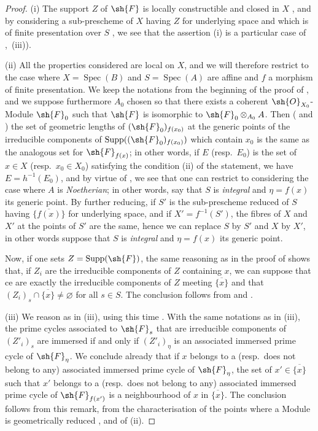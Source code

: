 \begin{proof}
\label{IV.9.9.2-proof}
(i) The support $Z$ of $\sh{F}$ is locally constructible and closed in $X$ , and by considering a sub-prescheme of $X$ having $Z$ for underlying space and which is of finite presentation over $S$ , we see that the assertion (i) is a particular case of ,~(iii)).

(ii) All the properties considered are local on $X$, and we will therefore restrict to the case where $X=\operatorname{Spec}(B)$ and $S=\operatorname{Spec}(A)$ are affine and $f$ a morphism of finite presentation.
We keep the notations from the beginning of the proof of , and we suppose furthermore $A_0$ chosen so that there exists a coherent $\sh{O}_{X_0}$-Module $\sh{F}_0$ such that $\sh{F}$ is isomorphic to $\sh{F}_0\otimes_{A_0}A$.
Then ( and ) the set of geometric lengths of $(\sh{F}_0)_{f(x_0)}$ at the generic points of the irreducible components of $\operatorname{Supp}((\sh{F}_0)_{f(x_0)})$ which contain $x_0$ is the same as the analogous set for $\sh{F}_{f(x)}$; in other words, if $E$ (resp.~$E_0$) is the set of $x\in X$ (resp.~$x_0\in X_0$) satisfying the condition (ii) of the statement, we have $E=h^{-1}(E_0)$, and by virtue of , we see that one can restrict to considering the case where $A$ is \emph{Noetherian}; in other words, say that $S$ is \emph{integral} and $\eta=f(x)$ its generic point.
By further reducing, if $S'$ is the sub-prescheme reduced of $S$ having $\{\overline{f(x)}\}$ for underlying space, and if $X'=f^{-1}(S')$, the fibres of $X$ and $X'$ at the points of $S'$ are the same, hence we can replace $S$ by $S'$ and $X$ by $X'$, in other words suppose that $S$ is \emph{integral} and $\eta=f(x)$ its generic point.

Now, if one sets $Z=\operatorname{Supp}(\sh{F})$, the same reasoning as in the proof of  shows that, if $Z_i$ are the irreducible components of $Z$ containing $x$, we can suppose that ce are exactly the irreducible components of $Z$ meeting $\overline{\{x\}}$ and that $(Z_i)_s\cap\overline{\{x\}}\neq\varnothing$ for all $s\in S$.
The conclusion follows from  and .

(iii) We reason as in (iii), using this time .
With the same notations as in (iii), the prime cycles associated to $\sh{F}_s$ that are irreducible components of $(Z'_i)_s$ are immersed if and only if $(Z'_i)_\eta$ is an associated immersed prime cycle of $\sh{F}_\eta$.
We conclude already that if $x$ belongs to a (resp.~does not belong to any) associated immersed prime cycle of $\sh{F}_\eta$, the set of $x'\in\overline{\{x\}}$ such that $x'$ belongs to a (resp.~does not belong to any) associated immersed prime cycle of $\sh{F}_{f(x')}$ is a neighbourhood of $x$ in $\overline{\{x\}}$.
The conclusion follows from this remark, from the characterisation of the points where a Module is geometrically reduced , and of (ii).


\end{proof}
